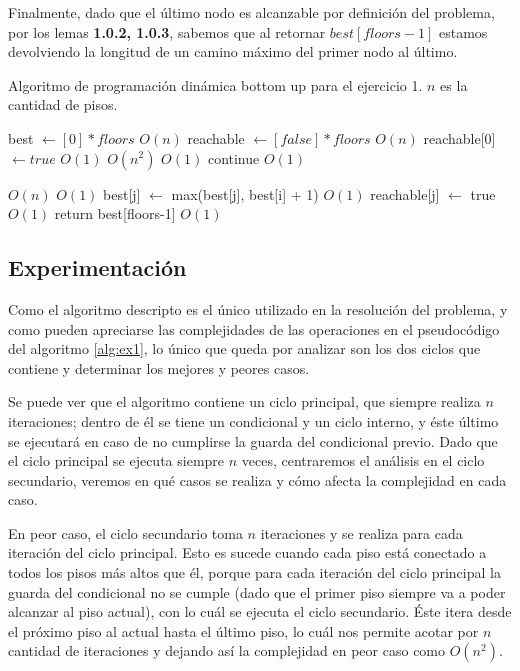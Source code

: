 \documentclass{article}
\theoremstyle{definition}
\theoremstyle{remark}
\begin{document}
Finalmente, dado que el último nodo es alcanzable por definición del problema, por los lemas \textbf{1.0.2, 1.0.3}, sabemos que al retornar $best[floors-1]$ estamos devolviendo la longitud de un camino máximo del primer nodo al último.

\begin{algorithm}[h!]
\caption{Algoritmo de programación dinámica bottom up para el ejercicio 1. $n$ es la cantidad de pisos.\label{alg:ex1}}

\begin{algorithmic}[h!]
\State best $\gets [0] * floors$ \Comment $O(n)$
\State reachable $\gets [false] * floors$ \Comment $O(n)$
\State reachable[0] $\gets true$ \Comment $O(1)$
 \Comment $O(n^2)$
     \Comment $O(1)$
        \State continue \Comment $O(1)$
    \EndIf
    
     \Comment $O(n)$
         \Comment $O(1)$
            \State best[j] $\gets$ max(best[j], best[i] + 1) \Comment $O(1)$
            \State reachable[j] $\gets$ true \Comment $O(1)$
        \EndIf    
    \EndFor
\EndFor
\State return best[floors-1] \Comment $O(1)$
\EndProcedure\\
\end{algorithmic}
\end{algorithm}

\subsection{Experimentación}

Como el algoritmo descripto es el único utilizado en la resolución del problema, y como pueden apreciarse las complejidades de las operaciones en el pseudocódigo del algoritmo \ref{alg:ex1}, lo único que queda por analizar son los dos ciclos que contiene y determinar los mejores y peores casos.

Se puede ver que el algoritmo contiene un ciclo principal, que siempre realiza $n$ iteraciones; dentro de él se tiene un condicional y un ciclo interno, y éste último se ejecutará en caso de no cumplirse la guarda del condicional previo. Dado que el ciclo principal se ejecuta siempre $n$ veces, centraremos el análisis en el ciclo secundario, veremos en qué casos se realiza y cómo afecta la complejidad en cada caso.

En peor caso, el ciclo secundario toma $n$ iteraciones y se realiza para cada iteración del ciclo principal. Esto es sucede cuando cada piso está conectado a todos los pisos más altos que él, porque para cada iteración del ciclo principal la guarda del condicional no se cumple (dado que el primer piso siempre va a poder alcanzar al piso actual), con lo cuál se ejecuta el ciclo secundario. Éste itera desde el próximo piso al actual hasta el último piso, lo cuál nos permite acotar por $n$ cantidad de iteraciones y dejando así la complejidad en peor caso como $O(n^2)$.
\end{document}
